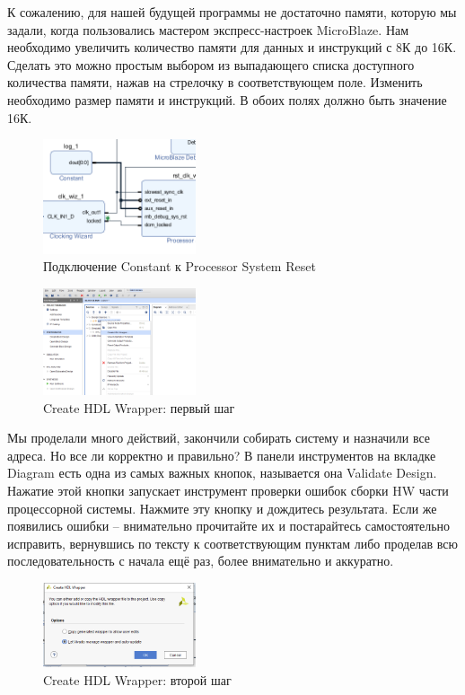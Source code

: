 \documentclass[a4paper,oneside ,10pt]{extreport}
\begin{document}
К сожалению, для нашей будущей программы не достаточно памяти, которую 
мы задали, когда пользовались мастером экспресс-настроек MicroBlaze. 
Нам необходимо увеличить количество памяти для данных и инструкций с 8К до 
16К. Сделать это можно простым выбором из выпадающего списка доступного 
количества памяти, нажав на стрелочку в соответствующем поле. Изменить 
необходимо размер памяти и инструкций. В обоих полях должно быть значение 16К.

\begin{figure}[!ht]
	\centering
	\includegraphics[width=0.4\textwidth]{image/log_1.png}
	\caption{Подключение Constant к Processor System Reset}
	\label{m_44}
\end{figure}

\begin{figure}[!ht]
	\centering
	\includegraphics[width=0.4\textwidth]{image/m_46.png}
	\caption{Create HDL Wrapper: первый шаг}
	\label{m_46}
\end{figure}

Мы проделали много действий, закончили собирать систему и назначили все 
адреса. Но все ли корректно и правильно? В панели инструментов на вкладке 
Diagram есть одна из самых важных кнопок, называется она Validate Design. Нажатие этой кнопки запускает инструмент проверки 
ошибок сборки HW части процессорной системы. Нажмите эту кнопку и дождитесь результата. Если же появились ошибки – внимательно прочитайте их и постарайтесь самостоятельно исправить, вернувшись по тексту к соответствующим пунктам либо проделав всю последовательность с начала ещё раз, более внимательно и аккуратно.

\begin{figure}[!ht]
	\centering
	\includegraphics[width=0.4\textwidth]{image/m_47.png}
	\caption{Create HDL Wrapper: второй шаг}
	\label{m_47}
\end{figure}
\end{document}

